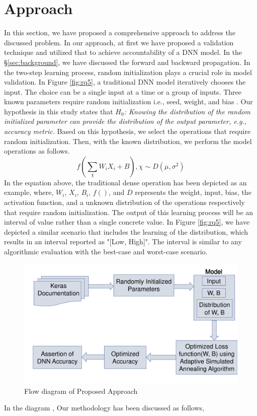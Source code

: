 \section{Approach}
\label{sec:approach}
In this section, we have proposed a comprehensive approach to address the discussed problem. In our approach, at first we have proposed a validation technique and utilized that to achieve accountability of a DNN model. In the \S\ref{sec:background}, we have discussed the forward and backward propagation. In the two-step learning process, random initialization plays a crucial role in model validation. In Figure \ref{fig:rq5}, a traditional DNN model iteratively chooses the input. The choice can be a single input at a time or a group of inputs. Three known parameters require random initialization i.e., seed, weight, and bias \cite{sutskever2013importance}. Our hypothesis in this study states that \emph{$H_0$: Knowing the distribution of the random initialized parameter can provide the distribution of the output parameter, e.g., accuracy metric.} Based on this hypothesis, we select the operations that require random initialization. Then, with the known distribution, we perform the model operations as follows.
\begin{equation}
f(\sum_{\chi}{W_iX_i+B}), \chi\sim D(\mu, \sigma^2)
\end{equation}
In the equation above, the traditional dense operation has been depicted as an example, where, $W_i$, $X_i$, $B_i$, $f()$, and $D$ represents the weight, input, bias, the activation function, and a unknown distribution of the operations respectively that require random initialization. The output of this learning process will be an interval of value rather than a single concrete value. In Figure \ref{fig:rq5}, we have depicted a similar scenario that includes the learning of the distribution, which results in an interval reported as "[Low, High]". The interval is similar to any algorithmic evaluation with the best-case and worst-case scenario. 
\begin{figure}
	\includegraphics[width=0.8\linewidth]{flowdiagram}
	\centering
	\caption{Flow diagram of Proposed Approach}
	\label{fig:flow}
\end{figure}
In the diagram , 
Our methodology has been discussed as follows,
